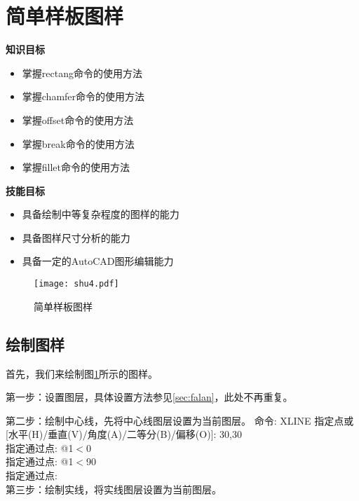 \section{简单样板图样}\label{sec:yangban}
{\bfseries 知识目标}
\begin{itemize}
\item 掌握rectang命令的使用方法
\item 掌握chamfer命令的使用方法
\item 掌握offset命令的使用方法
\item 掌握break命令的使用方法
\item 掌握fillet命令的使用方法
\end{itemize}

{\bfseries 技能目标}
\begin{itemize}
\item 具备绘制中等复杂程度的图样的能力
\item 具备图样尺寸分析的能力
\item 具备一定的AutoCAD图形编辑能力
\end{itemize}
\begin{figure}[htbp]
\centering
\texttt{[image: shu4.pdf]}
\caption{简单样板图样}\label{fig:renwu3}
\end{figure}
\subsection{绘制图样}
首先，我们来绘制图\ref{fig:renwu3}所示的图样。

第一步：设置图层，具体设置方法参见\ref{sec:falan}，此处不再重复。

第二步：绘制中心线，先将中心线图层设置为当前图层。
\noindent
命令: XLINE 指定点或 [水平(H)/垂直(V)/角度(A)/二等分(B)/偏移(O)]: 30,30\\
指定通过点: @1$<$0\\
指定通过点: @1$<$90\\
指定通过点:\\
\indent
第三步：绘制实线，将实线图层设置为当前图层。

